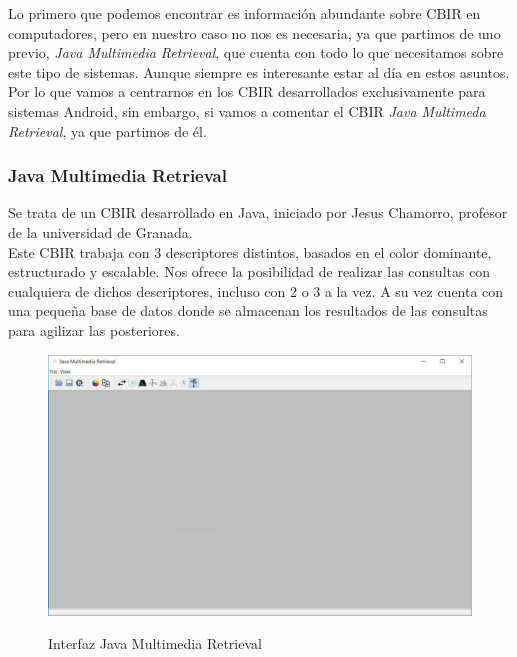 Lo primero que podemos encontrar es información abundante sobre CBIR en computadores, pero en nuestro caso no nos es necesaria, ya que partimos de uno previo, \textit{Java Multimedia Retrieval}, que cuenta con todo lo que necesitamos sobre este tipo de sistemas. Aunque siempre es interesante estar al día en estos asuntos.\\

Por lo que vamos a centrarnos en los CBIR desarrollados exclusivamente para sistemas Android, sin embargo, si vamos a comentar el CBIR \textit{Java Multimeda Retrieval}, ya que partimos de él.

\subsubsection{Java Multimedia Retrieval}

Se trata de un CBIR desarrollado en Java, iniciado por Jesus Chamorro, profesor de la universidad de Granada.\\

Este CBIR trabaja con 3 descriptores distintos, basados en el color dominante, estructurado y escalable. Nos ofrece la posibilidad de realizar las consultas con cualquiera de dichos descriptores, incluso con 2 o 3 a la vez. A su vez cuenta con una pequeña base de datos donde se almacenan los resultados de las consultas para agilizar las posteriores.

\begin{figure}[H] %
\centering
\includegraphics[scale=0.5]{imagenes/jmr.jpg}  %
\label{jmr}
\caption{Interfaz Java Multimedia Retrieval}
\end{figure}


